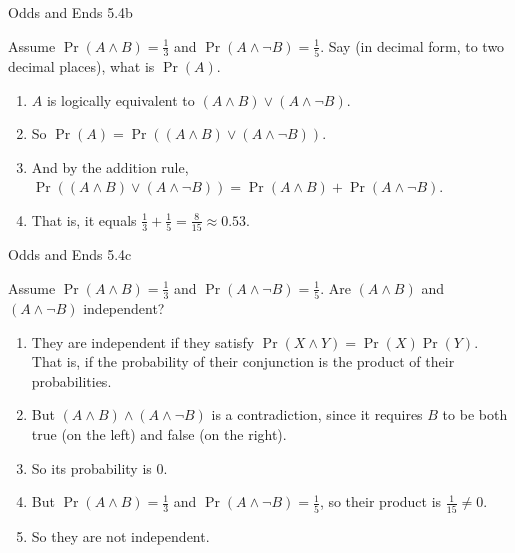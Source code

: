 \documentclass[
  ignorenonframetext,
]{beamer}
\providecommand{\tightlist}{%
  \setlength{\itemsep}{0pt}\setlength{\parskip}{0pt}}
\renewcommand{\,}{\text{, }}
\begin{document}
\begin{frame}{Odds and Ends 5.4b}
\protect\hypertarget{odds-and-ends-5.4b}{}

Assume \(\Pr(A \wedge B) = \frac{1}{3}\) and
\(\Pr(A \wedge \neg B) = \frac{1}{5}\). Say (in decimal form, to two
decimal places), what is \(\Pr(A)\). \pause

\begin{enumerate}
\tightlist
\item
  \(A\) is logically equivalent to
  \((A \wedge B) \vee (A \wedge \neg B)\). \pause
\item
  So \(\Pr(A) = \Pr((A \wedge B) \vee (A \wedge \neg B))\). \pause
\item
  And by the addition rule,
  \(\Pr((A \wedge B) \vee (A \wedge \neg B)) = \Pr(A \wedge B) + \Pr(A \wedge \neg B)\).
  \pause
\item
  That is, it equals
  \(\frac{1}{3} + \frac{1}{5} = \frac{8}{15} \approx 0.53\).
\end{enumerate}

\end{frame}

\begin{frame}{Odds and Ends 5.4c}
\protect\hypertarget{odds-and-ends-5.4c}{}

Assume \(\Pr(A \wedge B) = \frac{1}{3}\) and
\(\Pr(A \wedge \neg B) = \frac{1}{5}\). Are \((A \wedge B)\) and
\((A \wedge \neg B)\) independent? \pause

\begin{enumerate}
\tightlist
\item
  They are independent if they satisfy
  \(\Pr(X \wedge Y) = \Pr(X)\Pr(Y)\). That is, if the probability of
  their conjunction is the product of their probabilities. \pause
\item
  But \((A \wedge B) \wedge (A \wedge \neg B)\) is a contradiction,
  since it requires \(B\) to be both true (on the left) and false (on
  the right). \pause
\item
  So its probability is 0. \pause
\item
  But \(\Pr(A \wedge B) = \frac{1}{3}\) and
  \(\Pr(A \wedge \neg B) = \frac{1}{5}\), so their product is
  \(\frac{1}{15} \neq 0\).
\item
  So they are not independent.
\end{enumerate}

\end{frame}
\end{document}
